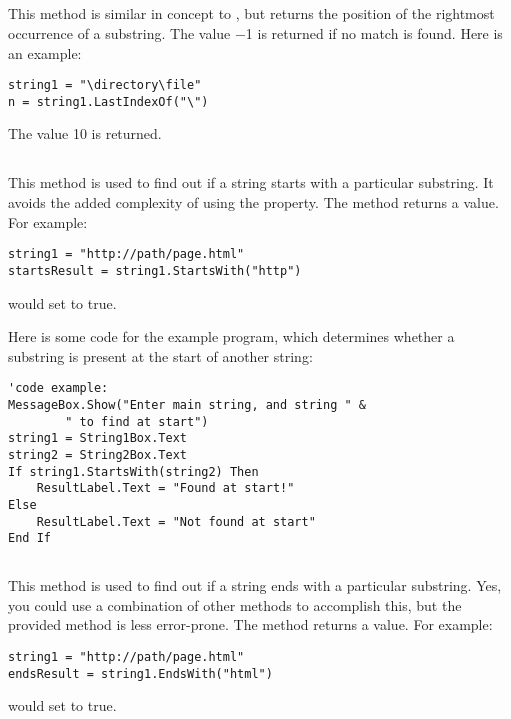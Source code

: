 		\subsection*{}
			This method is similar in concept to , but returns the position of the rightmost occurrence of a substring. The value −1 is returned if no match is found. Here is an example:
			\begin{lstlisting}
string1 = "\directory\file"
n = string1.LastIndexOf("\")
			\end{lstlisting}
			The value 10 is returned.

		\subsection*{}
			This method is used to find out if a string starts with a particular substring. It avoids the added complexity of using the  property. The method returns a  value. For example:
			\begin{lstlisting}
string1 = "http://path/page.html"
startsResult = string1.StartsWith("http")
			\end{lstlisting}
			would set  to true.
			
			Here is some code for the example program, which determines whether a substring is present at the start of another string:
			\begin{lstlisting}
'code example:
MessageBox.Show("Enter main string, and string " &
		" to find at start")
string1 = String1Box.Text
string2 = String2Box.Text
If string1.StartsWith(string2) Then
	ResultLabel.Text = "Found at start!"
Else
	ResultLabel.Text = "Not found at start"
End If
			\end{lstlisting}

		\subsection*{}
			This method is used to find out if a string ends with a particular substring. Yes, you could use a combination of other methods to accomplish this, but the provided method is less error-prone. The method returns a  value. For example:
			\begin{lstlisting}
string1 = "http://path/page.html"
endsResult = string1.EndsWith("html")
			\end{lstlisting}
			would set  to true.

